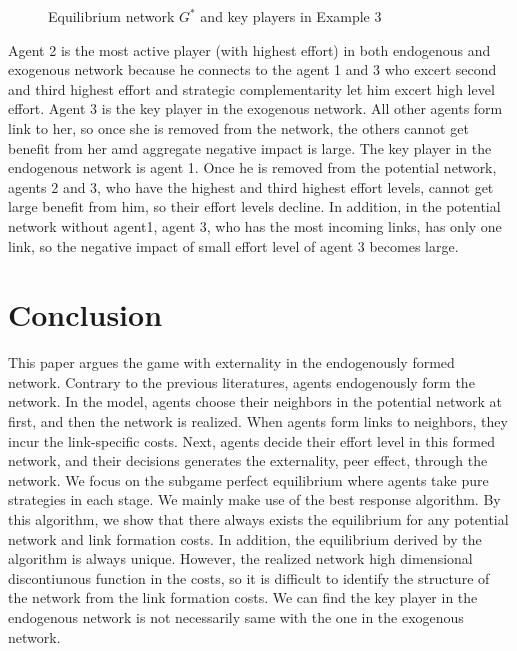 \documentclass[12pt]{article}
\theoremstyle{definition}
\begin{document}
\begin{figure}[h]
\caption{Equilibrium network $G^{*}$ and key players in Example 3} \label{fig:ex3}
\end{figure}

Agent 2 is the most active player (with highest effort) in both endogenous and exogenous network because he connects to the agent 1 and 3 who excert second and third highest effort and strategic complementarity let him excert high level effort.
Agent 3 is the key player in the exogenous network.
All other agents form link to her, so once she is removed from the network, the others cannot get benefit from her amd aggregate negative impact is large.
The key player in the endogenous network is agent 1.
Once he is removed from the potential network, agents 2 and 3, who have the highest and third highest effort levels, cannot get large benefit from him, so their effort levels decline.
In addition, in the potential network without agent1, agent 3, who has the most incoming links, has only one link, so the negative impact of small effort level of agent 3 becomes large.


\section{Conclusion}

This paper argues the game with externality in the endogenously formed network.
Contrary to the previous literatures, agents endogenously form the network.
In the model, agents choose their neighbors in the potential network at first, and then the network is realized.
When agents form links to neighbors, they incur the link-specific costs.
Next, agents decide their effort level in this formed network, and their decisions generates the externality, peer effect, through the network.
We focus on the subgame perfect equilibrium where agents take pure strategies in each stage.
We mainly make use of the best response algorithm.
By this algorithm, we show that there always exists the equilibrium for any potential network and link formation costs.
In addition, the equilibrium derived by the algorithm is always unique.
However, the realized network high dimensional discontiunous function in the costs, so it is difficult to identify the structure of the network from the link formation costs.
We can find the key player in the endogenous network is not necessarily same with the one in the exogenous network.
\end{document}
